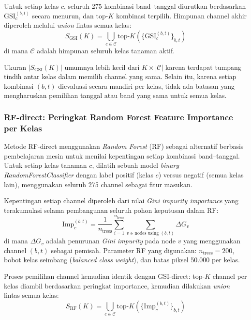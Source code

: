 Untuk setiap kelas $c$, seluruh 275 kombinasi band--tanggal diurutkan berdasarkan $\text{GSI}_{c}^{(b,t)}$ secara menurun, dan top-$K$ kombinasi terpilih.
Himpunan channel akhir diperoleh melalui \textit{union} lintas semua kelas:
\begin{equation}
    S_{\text{GSI}}(K) = \bigcup_{c \in \mathcal{C}} \text{top-}K\left(\{\text{GSI}_{c}^{(b,t)}\}_{b,t}\right)
\end{equation}
di mana $\mathcal{C}$ adalah himpunan seluruh kelas tanaman aktif.

Ukuran $|S_{\text{GSI}}(K)|$ umumnya lebih kecil dari $K \times |\mathcal{C}|$ karena terdapat tumpang tindih antar kelas dalam memilih channel yang sama.
Selain itu, karena setiap kombinasi $(b, t)$ dievaluasi secara mandiri per kelas, tidak ada batasan yang mengharuskan pemilihan tanggal atau band yang sama untuk semua kelas.

\subsubsection{RF-direct: Peringkat Random Forest Feature Importance per Kelas}
\label{subsubsec:rf_direct}

Metode RF-direct menggunakan \textit{Random Forest} (RF) sebagai alternatif berbasis pembelajaran mesin untuk menilai kepentingan setiap kombinasi band--tanggal.
Untuk setiap kelas tanaman $c$, dilatih sebuah model \textit{binary RandomForestClassifier} dengan label positif (kelas $c$) versus negatif (semua kelas lain), menggunakan seluruh 275 channel sebagai fitur masukan.

Kepentingan setiap channel diperoleh dari nilai \textit{Gini impurity importance} yang terakumulasi selama pembangunan seluruh pohon keputusan dalam RF:
\begin{equation}
    \text{Imp}_{c}^{(b,t)} = \frac{1}{n_{\text{trees}}} \sum_{i=1}^{n_{\text{trees}}} \sum_{v \in \text{nodes using }(b,t)} \Delta G_v
\end{equation}
di mana $\Delta G_v$ adalah penurunan \textit{Gini impurity} pada node $v$ yang menggunakan channel $(b,t)$ sebagai pemisah.
Parameter RF yang digunakan: $n_{\text{trees}} = 200$, bobot kelas seimbang (\textit{balanced class weight}), dan batas piksel 50.000 per kelas.

Proses pemilihan channel kemudian identik dengan GSI-direct: top-$K$ channel per kelas diambil berdasarkan peringkat importance, kemudian dilakukan \textit{union} lintas semua kelas:
\begin{equation}
    S_{\text{RF}}(K) = \bigcup_{c \in \mathcal{C}} \text{top-}K\left(\{\text{Imp}_{c}^{(b,t)}\}_{b,t}\right)
\end{equation}


